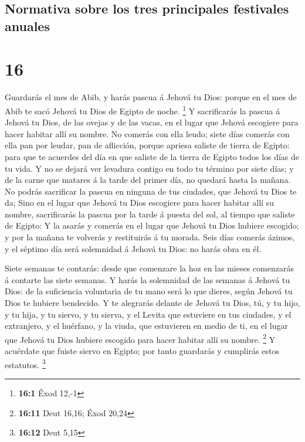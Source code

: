 \hypertarget{normativa-sobre-los-tres-principales-festivales-anuales}{%
\subsection{Normativa sobre los tres principales festivales
anuales}\label{normativa-sobre-los-tres-principales-festivales-anuales}}

\hypertarget{section-15}{%
\section{16}\label{section-15}}

 Guardarás el mes de Abib, y harás pascua á Jehová tu Dios:
porque en el mes de Abib te sacó Jehová tu Dios de Egipto de noche.
\footnote{\textbf{16:1} Éxod 12,-1}  Y sacrificarás la
pascua á Jehová tu Dios, de las ovejas y de las vacas, en el lugar que
Jehová escogiere para hacer habitar allí su nombre.  No
comerás con ella leudo; siete días comerás con ella pan por leudar, pan
de aflicción, porque apriesa saliste de tierra de Egipto: para que te
acuerdes del día en que saliste de la tierra de Egipto todos los días de
tu vida.  Y no se dejará ver levadura contigo en todo tu
término por siete días; y de la carne que matares á la tarde del primer
día, no quedará hasta la mañana.  No podrás sacrificar la
pascua en ninguna de tus ciudades, que Jehová tu Dios te da;
 Sino en el lugar que Jehová tu Dios escogiere para hacer
habitar allí su nombre, sacrificarás la pascua por la tarde á puesta del
sol, al tiempo que saliste de Egipto:  Y la asarás y comerás
en el lugar que Jehová tu Dios hubiere escogido; y por la mañana te
volverás y restituirás á tu morada.  Seis días comerás
ázimos, y el séptimo día será solemnidad á Jehová tu Dios: no harás obra
en él.

 Siete semanas te contarás: desde que comenzare la hoz en
las mieses comenzarás á contarte las siete semanas.  Y
harás la solemnidad de las semanas á Jehová tu Dios: de la suficiencia
voluntaria de tu mano será lo que dieres, según Jehová tu Dios te
hubiere bendecido.  Y te alegrarás delante de Jehová tu
Dios, tú, y tu hijo, y tu hija, y tu siervo, y tu sierva, y el Levita
que estuviere en tus ciudades, y el extranjero, y el huérfano, y la
viuda, que estuvieren en medio de ti, en el lugar que Jehová tu Dios
hubiere escogido para hacer habitar allí su nombre. \footnote{\textbf{16:11}
  Deut 16,16; Éxod 20,24}  Y acuérdate que fuiste siervo en
Egipto; por tanto guardarás y cumplirás estos estatutos. \footnote{\textbf{16:12}
  Deut 5,15}

